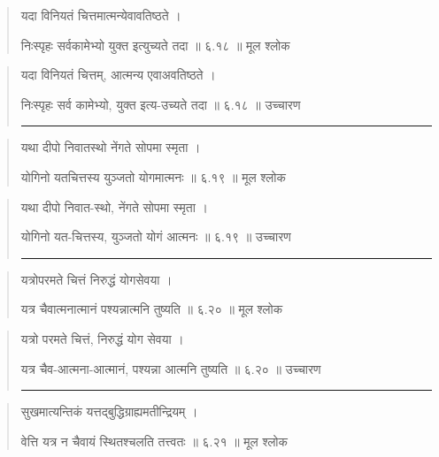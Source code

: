 \begin{quotation}  
यदा विनियतं चित्तमात्मन्येवावतिष्ठते  ।  

निःस्पृहः सर्वकामेभ्यो युक्त इत्युच्यते तदा  ॥ ६.१८ ॥  मूल श्लोक
\end{quotation}

\begin{quotation}

यदा विनियतं चित्तम्, आत्मन्य एवाअवतिष्ठते  ।  

निःस्पृहः सर्व कामेभ्यो, युक्त इत्य-उच्यते तदा  ॥ ६.१८ ॥  उच्चारण

\noindent\rule{16cm}{0.4pt} 
\end{quotation}


\begin{quotation}  

यथा दीपो निवातस्थो नेंगते सोपमा स्मृता  ।  

योगिनो यतचित्तस्य युञ्जतो योगमात्मनः  ॥ ६.१९ ॥  मूल श्लोक
\end{quotation}

\begin{quotation}

यथा दीपो निवात-स्थो, नेंगते सोपमा स्मृता  ।  

योगिनो यत-चित्तस्य, युञ्जतो योगं आत्मनः  ॥ ६.१९ ॥  उच्चारण

\noindent\rule{16cm}{0.4pt} 
\end{quotation}


\begin{quotation}  

यत्रोपरमते चित्तं निरुद्धं योगसेवया  ।  

यत्र चैवात्मनात्मानं पश्यन्नात्मनि तुष्यति  ॥ ६.२० ॥  मूल श्लोक
\end{quotation}

\begin{quotation}

यत्रो परमते चित्तं, निरुद्धं योग सेवया  ।  

यत्र चैव-आत्मना-आत्मानं, पश्यन्ना आत्मनि तुष्यति  ॥ ६.२० ॥  उच्चारण

\noindent\rule{16cm}{0.4pt} 
\end{quotation}


\begin{quotation}  

सुखमात्यन्तिकं यत्तद्‍बुद्धिग्राह्यमतीन्द्रियम्‌  ।  

वेत्ति यत्र न चैवायं स्थितश्चलति तत्त्वतः  ॥ ६.२१ ॥  मूल श्लोक
\end{quotation}

